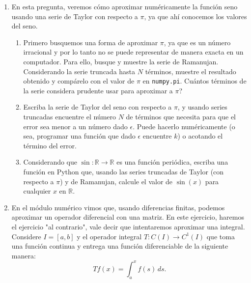 \documentclass{article}
\newcommand{\pts}[1]{[{\bf #1 puntos}] }
\begin{document}
\begin{enumerate}
    \item En esta pregunta, veremos cómo aproximar numéricamente la función seno usando una serie de Taylor con respecto a $\pi$, ya que ahí conocemos los valores del seno.
        \begin{enumerate}
            \item\pts{1} Primero busquemos una forma de aproximar $\pi$, ya que es un número irracional y por lo tanto no se puede representar de manera exacta en un computador. Para ello, busque y muestre la serie de Ramanujan. Considerando la serie truncada hasta $N$ términos, muestre el resultado obtenido y compárelo con el valor de $\pi$ en \texttt{numpy.pi}. Cuántos términos de la serie considera prudente usar para aproximar a $\pi$? 
            \item\pts{1} Escriba la serie de Taylor del seno con respecto a $\pi$, y usando series truncadas encuentre el número $N$ de términos que necesita para que el error sea menor a un número dado $\epsilon$. Puede hacerlo numéricamente (o sea, programar una función que dado $\epsilon$ encuentre $k$)  o acotando el término del error. 
            \item\pts{1} Considerando que $\sin:\mathbb R\to\mathbb R$ es una función periódica, escriba una función en Python que, usando las series truncadas de Taylor (con respecto a $\pi$) y de Ramanujan, calcule el valor de $\sin(x)$ para cualquier $x$ en $\mathbb R$. 
        \end{enumerate}

    \item En el módulo numérico vimos que, usando diferencias finitas, podemos aproximar un operador diferencial con una matriz. En este ejercicio, haremos el ejercicio "al contrario", vale decir que intentaremos aproximar una integral. Considere $I=[a,b]$ y el operador integral $T:C(I) \to C^1(I)$ que toma una función continua y entrega una función diferenciable de la siguiente manera:
                    $$ Tf(x) = \int_a^x f(s)\,ds. $$


\end{enumerate}
\end{document}
